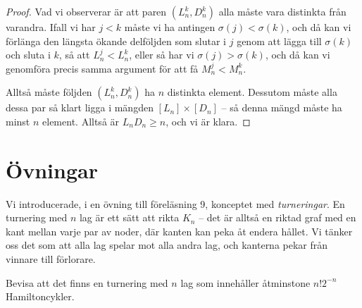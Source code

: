 \documentclass[nobib]{tufte-handout}
\begin{document}
\begin{theorem}
\begin{proof}
    Vad vi observerar är att paren $(L_n^k, D_n^k)$ alla måste vara distinkta från varandra. Ifall vi har $j < k$ måste vi ha antingen $\sigma(j) < \sigma(k)$, och då kan vi förlänga den längsta ökande delföljden som slutar i $j$ genom att lägga till $\sigma(k)$ och sluta i $k$, så att $L_n^j < L_n^k$, eller så har vi $\sigma(j) > \sigma(k)$, och då kan vi genomföra precis samma argument för att få $M_n^j < M_n^k$.

    Alltså måste följden $(L_n^k, D_n^k)$ ha $n$ distinkta element. Dessutom måste alla dessa par så klart ligga i mängden $[L_n] \times [D_n]$ -- så denna mängd måste ha minst $n$ element. Alltså är $L_n D_n \geq n$, och vi är klara.
  \end{proof}
\end{theorem}

\section{Övningar}

\begin{xca}
  Vi introducerade, i en övning till föreläsning 9, konceptet med \emph{turneringar}. En turnering med $n$ lag är ett sätt att rikta $K_n$ -- det är alltså en riktad graf med en kant mellan varje par av noder, där kanten kan peka åt endera hållet. Vi tänker oss det som att alla lag spelar mot alla andra lag, och kanterna pekar från vinnare till förlorare.

  Bevisa att det finns en turnering med $n$ lag som innehåller åtminstone $n!2^{-n}$ Hamiltoncykler.
\end{xca}

%
%
\end{document}
